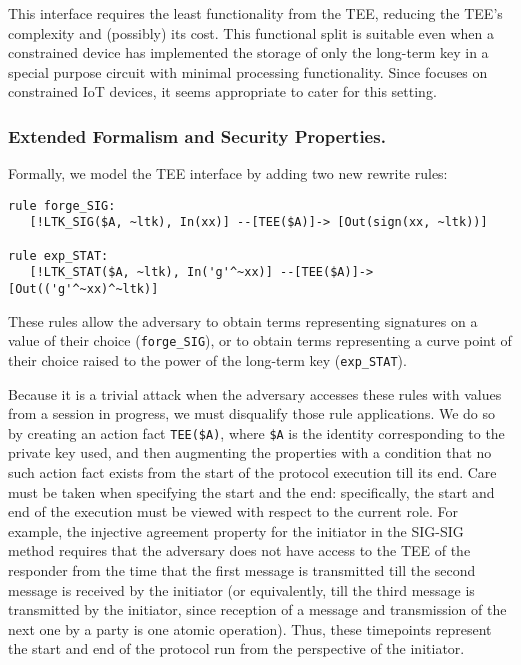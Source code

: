 \documentclass[runningheads]{llncs}
\newcommand{\mConstStyle}[1]{\textsf{#1}}
\newcommand{\mMethodStyle}[1]{\mConstStyle{#1}}
\newcommand{\mProtocolStyle}[1]{\text{#1}}
\newcommand{\mEdhoc}{\mProtocolStyle{EDHOC}}
\newcommand{\mSigSig}{\mMethodStyle{SIG-SIG}}
\begin{document}
%
This interface requires the least functionality from the TEE, reducing the 
TEE's complexity and (possibly) its cost.
%
This functional split is suitable even when a constrained device has
implemented the storage of only the long-term key in 
a special purpose circuit with minimal processing functionality.
%
Since \mEdhoc{} focuses on constrained IoT devices, it seems appropriate to
cater for this setting.
%

\subsubsection{Extended Formalism and Security Properties.}
\label{sec:TEE:fmAndProps}
Formally, we model the TEE interface by adding two new rewrite rules:
%
\begin{small}
\begin{verbatim}
rule forge_SIG:
   [!LTK_SIG($A, ~ltk), In(xx)] --[TEE($A)]-> [Out(sign(xx, ~ltk))]

rule exp_STAT:
   [!LTK_STAT($A, ~ltk), In('g'^~xx)] --[TEE($A)]-> [Out(('g'^~xx)^~ltk)]
\end{verbatim}
\end{small}
%
These rules allow the adversary to obtain terms representing signatures on a
value of their choice (\verb|forge_SIG|), or to obtain terms
representing a curve point of their choice raised to the power of the
long-term key (\verb|exp_STAT|).
%

Because it is a trivial attack when the adversary accesses these rules with values
from a session in progress, we must disqualify those rule applications.
%
We do so by creating an action fact \verb|TEE($A)|, where \verb|$A| is the
identity corresponding to the private key used, and then augmenting the
properties with a condition that no such action fact exists from the start of
the protocol execution till its end.
%
Care must be taken when specifying the start and the end: specifically,
the start and end of the execution must be viewed with respect to the current
role.
%
For example, the injective agreement property for the initiator in
the \mSigSig{} method requires that the adversary does not have access to the
TEE of the responder from the time that the first message is transmitted till
the second message is received by the initiator (or equivalently, till the third message is transmitted by the initiator, since reception of a message and transmission of the next one by a party is one atomic operation).
%
Thus, these timepoints represent the start and end of the
protocol run from the perspective of the initiator.
%
\end{document}
